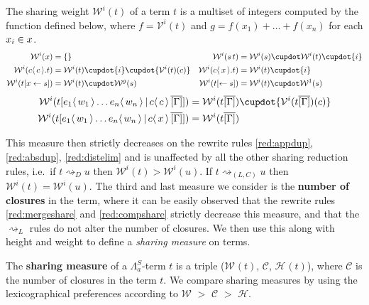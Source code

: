 \documentclass[runningheads]{llncs}
\let\vec\relax
\newcommand\defn{\textbf}
\newcommand{\FALC}{\Lambda^{S}_{a}}
\newcommand{\set}[1]{ \{ #1 \} }
\newcommand{\app}[2]{#1 \, #2}
\newcommand{\fake}[3]{#1 \langle \, #2 \, \rangle . #3}
\newcommand{\share}[3]{#1 [#2 \leftarrow #3]}
\newcommand{\dist}[5]{#1 [ #2 \, \vert \, \fakedist{#4}{#5} \, #3 ]}
\newcommand{\fakedist}[2]{#1 \langle \, #2 \, \rangle}
\newcommand{\height}[2]{\mathcal{H}^{#1}(#2)}
\newcommand{\weight}[2]{\mathcal{W}^{#1}(#2)}
\newcommand{\weightvar}[2]{\mathcal{V}^{#1}(#2)}
\begin{document}
\begin{definition}
The sharing weight $\weight{i}{t}$ of a term $t$ is a multiset of integers computed by the function defined below,  where $f = \weightvar{i}{t}$ and $g = f(x_{1}) + \dots + f(x_{n})$ for each $x_{i} \in \vec{x}$.
\begingroup
\allowdisplaybreaks
\begin{align*}
	\weight{i}{x} &= \set{} &
	\weight{i}{\app{s}{t}} &= \weight{i}{s} \cupdot \weight{i}{t} \cupdot \set{i}\\
	\weight{i}{\fake{c}{c}{t}} &= \weight{i}{t} \cupdot \set{i} \cupdot \set{\weightvar{i}{t}(c)} &
	\weight{i}{\fake{c}{\vec{x}}{t}} &= \weight{i}{t} \cupdot \set{i} \\
	\weight{i}{\share{t}{\vec{x}}{s}} &= \weight{i}{t} \cupdot \weight{g}{s} &
	\weight{i}{\share{t}{}{s}} &= \weight{i}{t} \cupdot \weight{1}{s} 
\end{align*}
\vspace{-0.8cm}
\begin{align*}
	\weight{i}{\dist{t}{\fakedist{e_{1}}{\vec{w_{1}}} \dots \fakedist{e_{n}}{\vec{w_{n}}}}{\overline{[\Gamma]}}{c}{c}} &= \weight{i}{t\overline{[\Gamma]}} \cupdot \set{\weightvar{i}{t\overline{[\Gamma]}} (c)} \\ %
	\weight{i}{\dist{t}{\fakedist{e_{1}}{\vec{w_{1}}} \dots \fakedist{e_{n}}{\vec{w_{n}}}}{\overline{[\Gamma]}}{c}{\vec{x}}} &= \weight{i}{t\overline{[\Gamma]}}
\end{align*}
\endgroup
\end{definition}

\noindent This measure then strictly decreases on the rewrite rules \ref{red:appdup}, \ref{red:absdup}, \ref{red:distelim} and is unaffected by all the other sharing reduction rules, i.e.\ if $t \rightsquigarrow_{D} u$ then $\weight{i}{t} > \weight{i}{u}$. If $t \rightsquigarrow_{(L, C)} u$ then $\weight{i}{t} = \weight{i}{u}$. The third and last measure we consider is the \defn{number of closures} in the term,  where it can be easily observed that the rewrite rules \ref{red:mergeshare} and \ref{red:compshare} strictly decrease this measure, and that the $\rightsquigarrow_{L}$ rules do not alter the number of closures. We then use this along with height and weight to define a \emph{sharing measure} on terms.

\begin{definition}
\label{def:sharingmeasure}
The \defn{sharing measure} of a $\FALC$-term $t$ is a triple ($\weight{}{t}$, $\mathcal{C}$, $\height{}{t}$), where $\mathcal{C}$ is the number of closures in the term $t$. We compare sharing measures by using the lexicographical preferences according to $\mathcal{W}$ $>$ $\mathcal{C}$ $>$ $\mathcal{H}$.
\end{definition}
\end{document}
